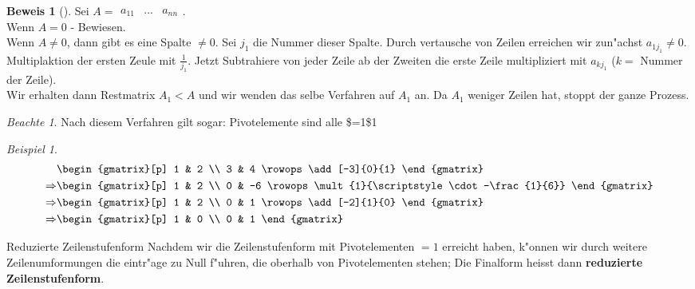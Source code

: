 \documentclass[11pt]{article}
\theoremstyle{remark}
\newtheorem{exa}{Beispiel}[section]
\newtheorem*{notte}{Beachte}
\theoremstyle{definition}
\newtheorem{prof}{Beweis}
\theoremstyle{remark}
\begin{document}
\begin{prof}[] \label{}
Sei \(A=\begin{matrix}a_{11}&...&a_{nn}\end{matrix}\). \\
Wenn \(A=0\) - Bewiesen. \\
Wenn \(A\not=0\), dann gibt es eine Spalte \(\not= 0\). Sei
\(j_1\) die Nummer dieser Spalte. Durch vertausche von Zeilen erreichen wir
zun"achst \(a_{1j_1}\not= 0\). Multiplaktion der ersten Zeule mit
\(\frac{1}{j_1}\). Jetzt Subtrahiere von jeder Zeile ab der Zweiten die erste
Zeile multipliziert mit \(a_{kj_1}\) (\(k=\) Nummer der Zeile). \\

Wir erhalten dann Restmatrix \(A_1<A\) und wir wenden das selbe Verfahren auf
\(A_1\) an. Da \(A_1\) weniger Zeilen hat, stoppt der ganze Prozess.

\begin{notte}
Nach diesem Verfahren gilt sogar: Pivotelemente sind alle \$=1\$1
\end{notte}
\end{prof}


\begin{exa}
\begin{align*}
  & \begin{gmatrix}[p]
      1 & 2 \\
      3 & 4
      \rowops
      \add[-3]{0}{1}
    \end{gmatrix} \\
  \Rightarrow & \begin{gmatrix}[p]
      1 & 2 \\
      0 & -6
      \rowops
      \mult{1}{\scriptstyle\cdot-\frac{1}{6}}
    \end{gmatrix} \\
  \Rightarrow & \begin{gmatrix}[p]
      1 & 2 \\
      0 & 1
      \rowops
      \add[-2]{1}{0}
    \end{gmatrix} \\
  \Rightarrow & \begin{gmatrix}[p]
      1 & 0 \\
      0 & 1
    \end{gmatrix}
\end{align*}
\end{exa}

\begin{definition}{Reduzierte Zeilenstufenform}{}
Nachdem wir die Zeilenstufenform mit Pivotelementen \(=1\) erreicht haben, k"onnen
wir durch weitere Zeilenumformungen die eintr"age zu Null f"uhren, die oberhalb
von Pivotelementen stehen; Die Finalform heisst dann \textbf{reduzierte
Zeilenstufenform}.
\end{definition}
\end{document}
